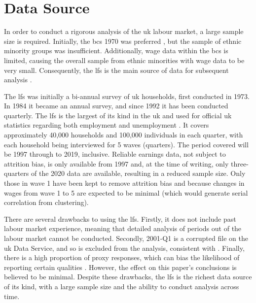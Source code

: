 \documentclass[class=article, crop=false]{standalone}
\begin{document}
\section{Data Source}
\label{sec:Data}
In order to conduct a rigorous analysis of the \acrshort{uk} labour market, a large sample size is required. Initially, the \acrlong{bcs} 1970 was preferred \citep{BCS}, but the sample of ethnic minority groups was insufficient. Additionally, wage data within the \acrshort{bcs} is limited, causing the overall sample from ethnic minorities with wage data to be very small. Consequently, the \acrfull{lfs} is the main source of data for subsequent analysis \citep{ONSk}.

The \acrshort{lfs} was initially a bi-annual survey of \acrshort{uk} households, first conducted in 1973. In 1984 it became an annual survey, and since 1992 it has been conducted quarterly. The \acrshort{lfs} is the largest of its kind in the \acrshort{uk} and used for official \acrshort{uk} statistics regarding both employment and unemployment \citep{ONS}. It covers approximately 40,000 households and 100,000 individuals in each quarter, with each household being interviewed for 5 waves (quarters). The period covered will be 1997 through to 2019, inclusive. Reliable earnings data, not subject to attrition bias, is only available from 1997 \citep{ONSa} and, at the time of writing, only three-quarters of the 2020 data are available, resulting in a reduced sample size. Only those in wave 1 have been kept to remove attrition bias and because changes in wages from wave 1 to 5 are expected to be minimal (which would generate serial correlation from clustering).


There are several drawbacks to using the \acrshort{lfs}. Firstly, it does not include past labour market experience, meaning that detailed analysis of periods out of the labour market cannot be conducted. Secondly, 2001-Q1 is a corrupted file on the \acrshort{uk} Data Service, and so is excluded from the analysis, consistent with \citet{Longhi}. Finally, there is a high proportion of proxy responses, which can bias the likelihood of reporting certain qualities \citep{Clarke, Davies}. However, the effect on this paper's conclusions is believed to be minimal. Despite these drawbacks, the \acrshort{lfs} is the richest data source of its kind, with a large sample size and the ability to conduct analysis across time.
\end{document}
